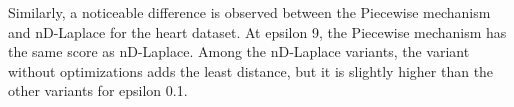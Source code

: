 {  Similarly, a noticeable difference is observed between the Piecewise mechanism and nD-Laplace for the heart dataset. At epsilon 9, the Piecewise mechanism has the same score as nD-Laplace.
  Among the nD-Laplace variants, the variant without optimizations adds the least distance, but it is slightly higher than the other variants for epsilon 0.1.
  \newpage
}
